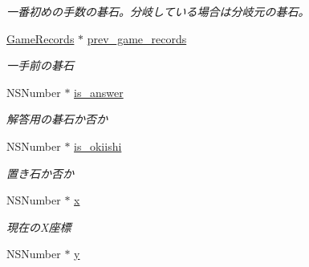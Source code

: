 \begin{DoxyCompactItemize}
\begin{DoxyCompactList}\small\item\em 一番初めの手数の碁石。分岐している場合は分岐元の碁石。 \end{DoxyCompactList}\item 
\hypertarget{interface_game_records_adc059fcab08c2098368b7ed9899fc3ba}{
\hyperlink{interface_game_records}{GameRecords} $\ast$ \hyperlink{interface_game_records_adc059fcab08c2098368b7ed9899fc3ba}{prev\_\-game\_\-records}}
\label{interface_game_records_adc059fcab08c2098368b7ed9899fc3ba}

\begin{DoxyCompactList}\small\item\em 一手前の碁石 \end{DoxyCompactList}\item 
\hypertarget{interface_game_records_af6b124bd715d3a78d93421a5a6a279a3}{
NSNumber $\ast$ \hyperlink{interface_game_records_af6b124bd715d3a78d93421a5a6a279a3}{is\_\-answer}}
\label{interface_game_records_af6b124bd715d3a78d93421a5a6a279a3}

\begin{DoxyCompactList}\small\item\em 解答用の碁石か否か \end{DoxyCompactList}\item 
\hypertarget{interface_game_records_a411adb0aa72ba8164b4818b7330a3584}{
NSNumber $\ast$ \hyperlink{interface_game_records_a411adb0aa72ba8164b4818b7330a3584}{is\_\-okiishi}}
\label{interface_game_records_a411adb0aa72ba8164b4818b7330a3584}

\begin{DoxyCompactList}\small\item\em 置き石か否か \end{DoxyCompactList}\item 
\hypertarget{interface_game_records_aa02e21f2edd9f68f7e04cd2977cb95bc}{
NSNumber $\ast$ \hyperlink{interface_game_records_aa02e21f2edd9f68f7e04cd2977cb95bc}{x}}
\label{interface_game_records_aa02e21f2edd9f68f7e04cd2977cb95bc}

\begin{DoxyCompactList}\small\item\em 現在のX座標 \end{DoxyCompactList}\item 
\hypertarget{interface_game_records_a45fd4561f02e032dad6e80d864b7bfc1}{
NSNumber $\ast$ \hyperlink{interface_game_records_a45fd4561f02e032dad6e80d864b7bfc1}{y}}
\label{interface_game_records_a45fd4561f02e032dad6e80d864b7bfc1}


\end{DoxyCompactItemize}
